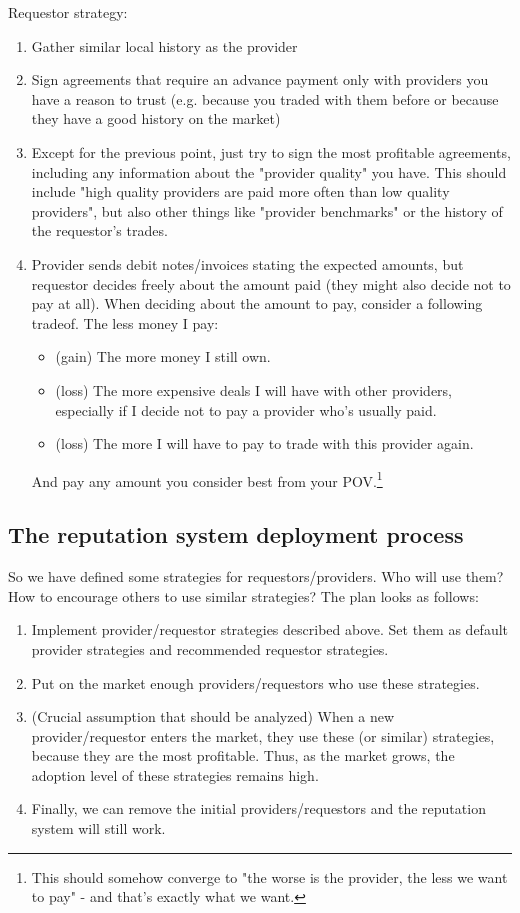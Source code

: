 \documentclass{article}
\begin{document}
Requestor strategy:
\begin{enumerate}
    \item Gather similar local history as the provider
    \item Sign agreements that require an advance payment only with providers you have a reason to trust 
        (e.g. because you traded with them before or because they have a good history on the market)
    \item Except for the previous point, just try to sign the most profitable agreements, including any information about the "provider quality" you have.
        This should include "high quality providers are paid more often than low quality providers", but also other things like "provider benchmarks" or
        the history of the requestor's trades.
    \item Provider sends debit notes/invoices stating the expected amounts, but requestor decides freely about the amount paid (they might also decide not to pay at all).
        When deciding about the amount to pay, consider a following tradeof. The less money I pay:
        \begin{itemize}
            \item (gain) The more money I still own.
            \item (loss) The more expensive deals I will have with other providers, especially if I decide not to pay a provider who's usually paid.
            \item (loss) The more I will have to pay to trade with this provider again.
        \end{itemize}
        And pay any amount you consider best from your POV.\footnote{
            This should somehow converge to "the worse is the provider, the less we want to pay" - and that's exactly what we want.
        }
\end{enumerate}

\subsection{The reputation system deployment process}

So we have defined some strategies for requestors/providers.
Who will use them? How to encourage others to use similar strategies?
The plan looks as follows:
\begin{enumerate}
    \item Implement provider/requestor strategies described above. Set them as default provider strategies and recommended requestor strategies.
    \item Put on the market enough providers/requestors who use these strategies.
    \item (Crucial assumption that should be analyzed) When a new provider/requestor enters the market, they use these (or similar) strategies, because they
        are the most profitable. Thus, as the market grows, the adoption level of these strategies remains high.
    \item Finally, we can remove the initial providers/requestors and the reputation system will still work.
\end{enumerate}
\end{document}
